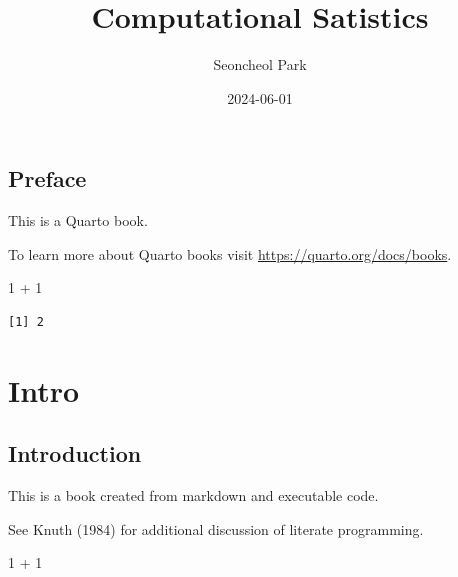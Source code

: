 \documentclass[
  letterpaper,
  DIV=11,
  numbers=noendperiod]{scrreprt}
\title{Computational Satistics}
\author{Seoncheol Park}
\date{2024-06-01}
\newenvironment{Shaded}{\begin{snugshade}}{\end{snugshade}}
\newcommand{\DecValTok}[1]{\textcolor[rgb]{0.68,0.00,0.00}{#1}}
\newcommand{\SpecialCharTok}[1]{\textcolor[rgb]{0.37,0.37,0.37}{#1}}
\renewcommand*\contentsname{Table of contents}
\newcommand\contentsname{Table of contents}
\theoremstyle{definition}
\theoremstyle{definition}
\theoremstyle{remark}
\begin{document}
\maketitle

\renewcommand{\Return}{\State \textbf{return}~}
\newcommand{\Print}{\State \textbf{print}~}
\newcommand{\Break}{\State \textbf{break}}
\newcommand{\Continue}{\State \textbf{continue}}
\newcommand{\True}{\textbf{true}}
\newcommand{\False}{\textbf{false}}
\renewcommand{\And}{\textbf{and}~}
\newcommand{\Or}{\textbf{or}~}
\renewcommand{\Not}{\textbf{not}~}
\newcommand{\To}{\textbf{to}~}
\newcommand{\DownTo}{\textbf{downto}~}


\renewcommand*\contentsname{Table of contents}
{
\hypersetup{linkcolor=}
\setcounter{tocdepth}{2}
\tableofcontents
}
\chapter*{Preface}\label{preface}


This is a Quarto book.

To learn more about Quarto books visit
\url{https://quarto.org/docs/books}.

\begin{Shaded}
\begin{Highlighting}[]
\DecValTok{1} \SpecialCharTok{+} \DecValTok{1}
\end{Highlighting}
\end{Shaded}

\begin{verbatim}
[1] 2
\end{verbatim}

\part{Intro}

\chapter{Introduction}\label{introduction}

This is a book created from markdown and executable code.

See Knuth (1984) for additional discussion of literate programming.

\begin{Shaded}
\begin{Highlighting}[]
\DecValTok{1} \SpecialCharTok{+} \DecValTok{1}
\end{Highlighting}
\end{Shaded}
\end{document}
